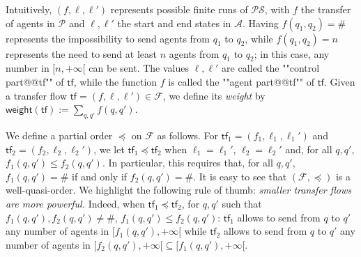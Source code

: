 \documentclass[10pt,a4paper]{article}
\renewcommand{\leq}{\leqslant}
\newcommand{\nsetinfinity}[1]{\mathord{[#1, +\infty[}}
\newcommand{\deff}{:=}
\newcommand{\PP}{\mathcal{P}}                  %
\newcommand*{\buchiaut}{\mathcal{A}}
\newcommand*{\abuchistate}{\ell}
\newcommand*{\bstate}{\abuchistate}
\newcommand{\prodsystem}{\mathcal{PS}}
\newcommand*{\dummysymb}{\#}
\newcommand*{\transferflows}{\mathcal{F}}
\newcommand*{\tfweight}[1]{\mathsf{weight}(#1)}
\newcommand*{\atf}{\mathsf{tf}}
\newcommand*{\letf}{\preceq}
\begin{document}
Intuitively, \((f,\abuchistate,\abuchistate')\) represents possible finite runs of \(\prodsystem\), with \(f\) the transfer of agents in \(\PP\) and \(\abuchistate,\abuchistate'\) the start and end states in \(\buchiaut\).
%
Having \(f(q_1, q_2) = \dummysymb\) represents the impossibility to send agents from \(q_1\) to \(q_2\), while \(f(q_1,q_2) = n\) represents the need to send at least \(n\) agents from \(q_1\) to \(q_2\); in this case, any number in \(\nsetinfinity{n}\) can be sent.
The values \(\abuchistate,\abuchistate'\) are called the ""control part@@tf"" of \(\atf\), while the function \(f\) is called the ""agent part@@tf"" of \(\atf\).
Given a transfer flow \(\atf =(f,\abuchistate,\abuchistate') \in \transferflows\), we define its \emph{weight} by \(\tfweight{\atf} \deff \sum_{q,q'} f(q,q')\).
%
%

We define a partial order \(\letf\) on \(\transferflows\) as follows.
For \(\atf_1 = (f_1,\bstate_1, \bstate_1')\) and \(\atf_2 = (f_2,\bstate_2,\bstate_2')\), we let \(\atf_1 \letf \atf_2\) when \(\bstate_1 = \bstate_1'\), \(\bstate_2 = \bstate_2'\) and, for all \(q,q'\), \(f_1(q,q') \leq f_2(q,q')\).
In particular, this requires that, for all \(q,q'\), \(f_1(q,q') = \dummysymb\) if and only if \(f_2(q,q') = \dummysymb\).
It is easy to see that \((\transferflows,\letf)\) is a well-quasi-order.
We highlight the following rule of thumb: \emph{smaller transfer flows are more powerful.
}
%
Indeed, when \(\atf_1 \letf \atf_2\), for \(q,q'\) such that \(f_1(q,q'), f_2(q,q') \ne\dummysymb\), \(f_1(q,q') \leq f_2(q,q')\): \(\atf_1\) allows to send from \(q\) to \(q'\) any number of agents in \(\nsetinfinity{f_1(q,q')}\) while \(\atf_2\) allows to send from \(q\) to \(q'\) any number of agents in \(\nsetinfinity{f_2(q,q')} \subseteq \nsetinfinity{f_1(q,q')}\).
\end{document}
